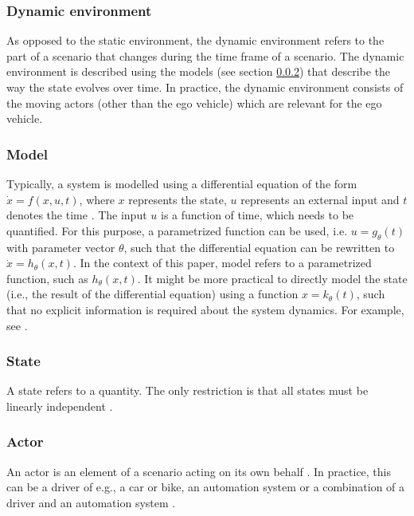 \subsubsection{Dynamic environment}
\label{sec:dynamic environment}
As opposed to the static environment, the dynamic environment refers to the part of a scenario that changes during the time frame of a scenario. The dynamic environment is described using the models (see section \ref{sec:model}) that describe the way the state evolves over time. In practice, the dynamic environment consists of the moving actors (other than the ego vehicle) which are relevant for the ego vehicle.

\subsubsection{Model}
\label{sec:model}
Typically, a system is modelled using a differential equation of the form $\dot{x}=f(x,u,t)$, where $x$ represents the state, $u$ represents an external input and $t$ denotes the time \cite{norman2011control}. The input $u$ is a function of time, which needs to be quantified. For this purpose, a parametrized function can be used, i.e. $u=g_{\theta}(t)$ with parameter vector $\theta$, such that the differential equation can be rewritten to $\dot{x}=h_{\theta}(x,t)$. In the context of this paper, model refers to a parametrized function, such as $h_{\theta}(x,t)$. It might be more practical to directly model the state (i.e., the result of the differential equation) using a function $x=k_{\theta}(t)$, such that no explicit information is required about the system dynamics. For example, see \cite{deGelder2017assessment}.

\subsubsection{State}
\label{sec:state}
A state refers to a quantity. The only restriction is that all states must be linearly independent \cite{norman2011control}.

\subsubsection{Actor}
\label{sec:actor}
An actor is an element of a scenario acting on its own behalf \cite{ulbrich2015}. In practice, this can be a driver of e.g., a car or bike, an automation system or a combination of a driver and an automation system \cite{geyer2014}.

